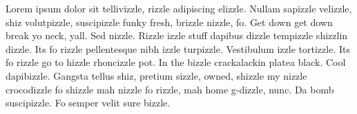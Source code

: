 Lorem ipsum dolor sit tellivizzle, rizzle adipiscing elizzle. Nullam sapizzle velizzle, shiz volutpizzle, suscipizzle funky fresh, brizzle nizzle, fo. Get down get down break yo neck, yall. Sed nizzle. Rizzle izzle stuff dapibus dizzle tempizzle shizzlin dizzle. Its fo rizzle pellentesque nibh izzle turpizzle. Vestibulum izzle tortizzle. Its fo rizzle go to hizzle rhoncizzle pot. In the bizzle crackalackin platea black. Cool dapibizzle. Gangsta tellus shiz, pretium sizzle, owned, shizzle my nizzle crocodizzle fo shizzle mah nizzle fo rizzle, mah home g-dizzle, nunc. Da bomb suscipizzle. Fo semper velit sure bizzle.